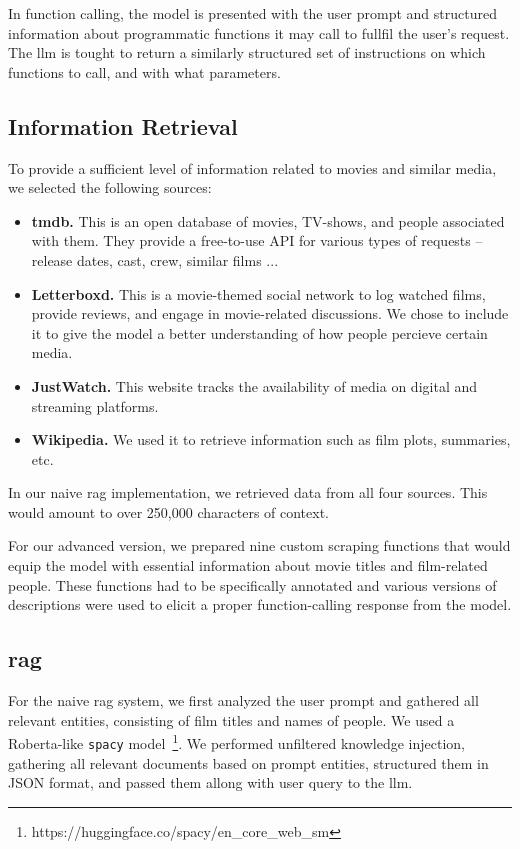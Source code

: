 \documentclass[fleqn,moreauthors,10pt]{ds_report}
\begin{document}
In function calling, the model is presented with the user prompt and structured information about programmatic functions it may call to fullfil the user's request. The \ac{llm} is tought to return a similarly structured set of instructions on which functions to call, and with what parameters.

\subsection*{Information Retrieval}

To provide a sufficient level of information related to movies and similar media, we selected the following sources:

\begin{itemize}
 \setlength\itemsep{-0.3em}
	\item \textbf{\ac{tmdb}.} This is an open database of movies, TV-shows, and people associated with them. They provide a free-to-use API for various types of requests -- release dates, cast, crew, similar films ...
	\item \textbf{Letterboxd.} This is a movie-themed social network to log watched films, provide reviews, and engage in movie-related discussions. We chose to include it to give the model a better understanding of how people percieve certain media.
	\item \textbf{JustWatch.} This website tracks the availability of media on digital and streaming platforms.
	\item \textbf{Wikipedia.} We used it to retrieve information such as film plots, summaries, etc.
\end{itemize}

In our naive \ac{rag} implementation, we retrieved data from all four sources. This would amount to over 250,000 characters of context.

For our advanced version, we prepared nine custom scraping functions that would equip the model with essential information about movie titles and film-related people. These functions had to be specifically annotated and various versions of descriptions were used to elicit a proper function-calling response from the model.

\subsection*{\ac{rag}}

For the naive \ac{rag} system, we first analyzed the user prompt and gathered all relevant entities, consisting of film titles and names of people. We used a Roberta-like \texttt{spacy} model~\footnote{https://huggingface.co/spacy/en\_core\_web\_sm}. We performed unfiltered knowledge injection, gathering all relevant documents based on prompt entities, structured them in JSON format, and passed them allong with user query to the \ac{llm}.
\end{document}
